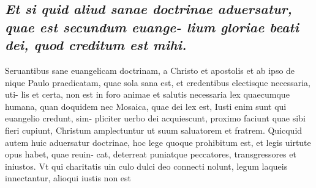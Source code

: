 \documentclass{article}
\begin{document}
\begin{pages}
\subsection*{\textit{Et si quid aliud sanae doctrinae aduersatur, quae est secundum euange- lium gloriae beati dei, quod creditum est mihi. }}\pstart Seruantibus sane euangelicam doctrinam, a Christo et apostolis et ab ipso de nique Paulo praedicatam, quae sola sana est, et credentibus electisque necessaria, uti- lis et certa, non est in foro animae et salutis necessaria lex quaecumque humana, quan doquidem nec Mosaica, quae dei lex est, Iusti enim sunt qui euangelio credunt, sim- pliciter uerbo dei acquiescunt, proximo faciunt quae sibi fieri cupiunt, Christum amplectuntur ut suum saluatorem et fratrem. Quicquid autem huic aduersatur doctrinae, hoc lege quoque prohibitum est, et legis uirtute opus habet, quae reuin- cat, deterreat puniatque peccatores, transgressores et iniustos. Vt qui charitatis uin culo dulci deo connecti nolunt, legum laqueis innectantur, alioqui iustis non est  \pend

\end{pages}
\end{document}
